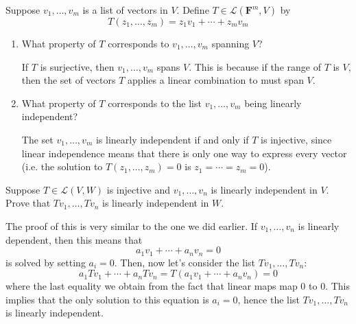 \documentclass[10pt]{article}
\newcommand{\F}{\mathbf F}
\begin{document}
	\begin{problem}
		Suppose \( v_1, \dots, v_m \) is a list of vectors in \( V \). Define \( T \in \mathcal L(\F^{m}, V) \) 
		by 
		\[
		T(z_1, \dots, z_m) = z_1v_1 + \cdots + z_m v_m
		\] 
		\begin{enumerate}[label=\alph*)]
			\item What property of \( T \) corresponds to \( v_1, \dots, v_m \) spanning \( V \)?

				\begin{solution}
					If \( T \) is surjective, then \( v_1, \dots, v_m \) spans \( V \). This is because if the range 
					of \( T \) is \( V \), then the set of vectors \( T \) applies a linear combination to 
					must span \( V \). 
				\end{solution}
			\item What property of \( T \) corresponds to the list \( v_1, \dots, v_m \) being linearly 
				independent?

				\begin{solution}
					The set \( v_1, \dots, v_m \) is linearly independent if and only if \( T \) is injective, since 
					linear independence means that there is only one way to express every vector (i.e. 
					the solution to \( T(z_1, \dots, z_m) = 0 \) is \( z_1 = \cdots = z_m  = 0 \)). 
				\end{solution}
		\end{enumerate}
	\end{problem}

	\begin{problem}
		Suppose \( T \in \mathcal L(V, W) \) is injective and \( v_1, \dots, v_n \) is linearly independent in \( V \).
		Prove that \( Tv_1, \dots, Tv_n \) is linearly independent in \( W \). 
	\end{problem}

	\begin{solution}
		The proof of this is very similar to the one we did earlier. If \( v_1, \dots, v_n \) is linearly dependent, 
		then this means that
		\[
		a_1v_1 + \cdots + a_nv_n = 0
		\] 
		is solved by setting \( a_i = 0 \). Then, now let's consider the list  \( Tv_1, \dots, Tv_n \):
		\[
		a_1Tv_1 + \cdots + a_n Tv_n = T(a_1v_1 + \cdots + a_nv_n) = 0
		\] 
		where the last equality we obtain from the fact that linear maps map 0 to 0. This implies that 
		the only solution to this equation is \( a_i = 0 \), hence the list \( Tv_1, \dots, Tv_n \) is 
		linearly independent.
	\end{solution}
\end{document}

